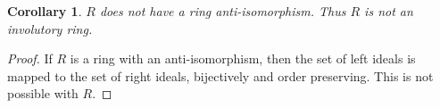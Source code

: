\documentclass[12pt]{article}
\newtheorem{coro}[thm]{Corollary}
\begin{document}
\begin{coro}
$R$ does not have a ring anti-isomorphism.  Thus $R$ is not an 
involutory ring.
\end{coro}
\begin{proof}
If $R$ is a ring with an anti-isomorphism, then the set of left ideals
is mapped to the set of right ideals, bijectively and order preserving.
This is not possible with $R$.
\end{proof}

\end{document}
